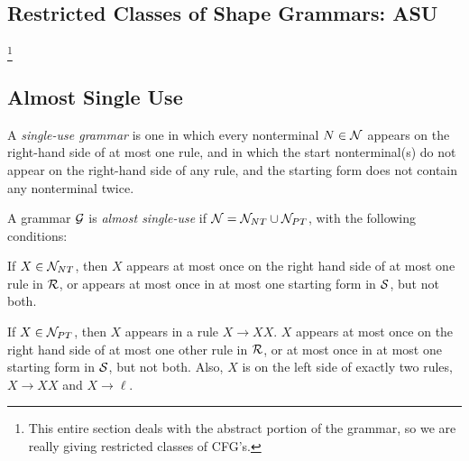 

\subsection{Restricted Classes of Shape Grammars: ASU}

\footnote{ This entire section deals with the abstract portion of the
  grammar, so we are really giving restricted classes of CFG's.}

\subsection{Almost Single Use}

\begin{defn}
A {\em single-use grammar} is one in which every nonterminal $N\in
{\mathcal N}$ appears on the right-hand side of at most one rule, and in which
the start nonterminal(s) do not appear on the right-hand side of any rule,
and the starting form does not contain any nonterminal twice.
\end{defn}

\begin{defn}
A grammar ${\mathcal G}$ is {\em almost single-use} if ${\mathcal N} = {\mathcal N}_{NT} \cup
{\mathcal N}_{PT}$, with the following conditions:
\bitem
\item If $X\in {\mathcal N}_{NT}$, then $X$ appears at most once on the right
  hand side of at most one rule in ${\mathcal R}$, or appears at most once in
  at most one starting form in ${\mathcal S}$, but not both.
\item If $X\in {\mathcal N}_{PT}$, then $X$ appears in a rule $X\to XX$. $X$
  appears at most once on the right hand side of at most one other
  rule in ${\mathcal R}$, or at most once in at most one starting form in
  ${\mathcal S}$, but not both. Also, $X$ is on the left side of exactly two
  rules, $X\to XX$ and $X\to \ell$.
\eitem
\end{defn}

